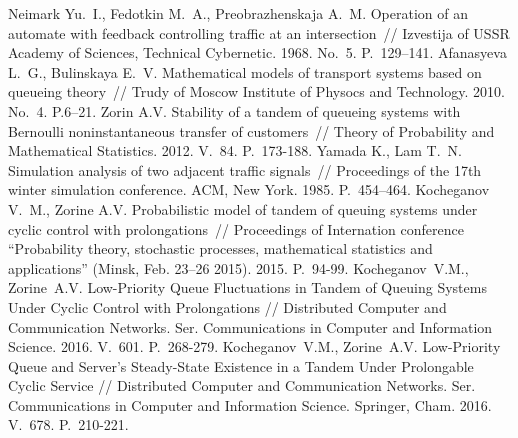 \documentclass[60x84/16,10pt]{dccn}
\begin{document}
{\begin{thebibliography}{11}
   Neimark Yu.~I., Fedotkin M.~A., Preobrazhenskaja A.~M. Operation of an automate
  with feedback controlling traffic at an intersection~// Izvestija of USSR Academy of Sciences,
  Technical Cybernetic. 1968. No.~5. P.~129--141.
%
  Afanasyeva L.~G., Bulinskaya E.~V. Mathematical models of transport systems based on queueing
  theory~// Trudy of Moscow Institute of Physocs and Technology. 2010. No.~4. P.6--21. 
  Zorin A.V. Stability of a tandem of queueing systems with Bernoulli noninstantaneous transfer of
  customers~// Theory of Probability and Mathematical Statistics. 2012. V.~84. P.~173-188.
  Yamada K., Lam T.~N. Simulation analysis of two adjacent traffic signals~// Proceedings of the
  17th winter simulation conference. ACM, New York. 1985. P.~454--464.
  Kocheganov V.~M., Zorine A.V. Probabilistic model of tandem of queuing systems under cyclic
  control with prolongations~// Proceedings of Internation conference ``Probability theory, stochastic processes, mathematical statistics
  and applications'' (Minsk, Feb. 23--26 2015). 2015. P.~94-99.
Kocheganov~V.M., Zorine~A.V. Low-Priority Queue Fluctuations in Tandem of Queuing Systems Under Cyclic Control with Prolongations // Distributed Computer and Communication Networks. Ser. Communications in Computer and Information Science. 2016. V.~601. P.~268-279.
Kocheganov~V.M., Zorine~A.V. Low-Priority Queue and Server's Steady-State Existence in a Tandem Under Prolongable Cyclic Service // Distributed Computer and Communication Networks. Ser. Communications in Computer and Information Science. Springer, Cham. 2016. V.~678. P.~210-221.
\end{thebibliography}

% 
% 


} %
\end{document}
